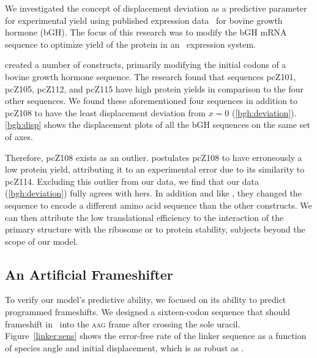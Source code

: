 \documentclass{article}
\begin{document}
We investigated the concept of displacement deviation as a predictive parameter
for experimental yield using published expression data~\cite{schoner:bgh} for bovine growth hormone (bGH).
The focus of this research was to modify the bGH mRNA sequence to optimize
yield of the protein in an \ecoli\ expression system.

\citet{schoner:bgh} created a number of constructs, primarily
modifying the initial codons of a bovine growth hormone sequence. The
research found that sequences pcZ101, pcZ105, pcZ112, and pcZ115 have
high protein yields in comparison to the four other sequences. We
found these aforementioned four sequences in addition to pcZ108 to
have the least displacement deviation from $x = 0$
(\autoref{bgh:deviation}). \autoref{bgh:disp} shows the displacement
plots of all the bGH sequences on the same set of axes.

Therefore, pcZ108 exists as an outlier. \citeauthor{schoner:bgh}
postulates pcZ108 to have erroneously a low protein yield, attributing
it to an experimental error due to its similarity to pcZ114. Excluding
this outlier from our data, we find that our data
(\autoref{bgh:deviation}) fully agrees with hers. In addition and like
\citeauthor{weiss87}, they changed the sequence to encode a different
amino acid sequence than the other constructs. We can then attribute
the low translational efficiency to the interaction of the primary
structure with the ribosome or to protein stability, subjects beyond
the scope of our model.

\subsection{An Artificial Frameshifter}
\label{section:linker}
To verify our model's predictive ability, we focused on its ability to
predict programmed frameshifts. We designed a sixteen-codon sequence
that should frameshift in \ecoli\ into
the \textsc{aag} frame after crossing the sole uracil.  Figure~\ref{linker:sens}
shows the error-free rate of the linker sequence as a function of species
angle and initial displacement, which is as robust as \prfB.
\end{document}
